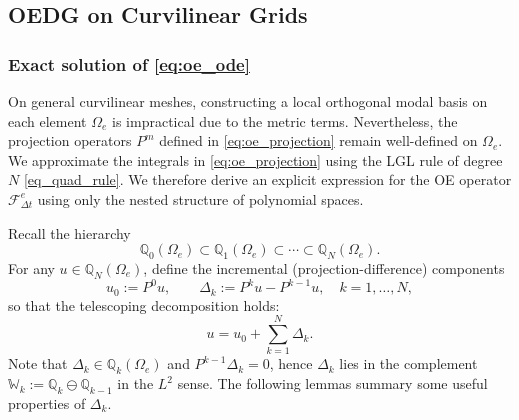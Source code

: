 \documentclass[fleqn,11pt]{amsart}
\newtheorem{remark}{Remark}[section]
\begin{document}

\subsection{OEDG on Curvilinear Grids}
\subsubsection{Exact solution of \eqref{eq:oe_ode}}

On general curvilinear meshes, constructing a local orthogonal modal
basis on each element $\Omega_e$ is impractical due to the metric terms. Nevertheless, the
projection operators $P^m$ defined in \eqref{eq:oe_projection} remain
well-defined on $\Omega_e$. We approximate the integrals in \eqref{eq:oe_projection}
using the LGL rule of degree $N$ \eqref{eq_quad_rule}.
We therefore derive an explicit expression
for the OE operator $\mathcal F_{\Delta t}^e$ using only the nested
structure of polynomial spaces.

Recall the hierarchy
\[
\mathbb Q_0(\Omega_e)\subset \mathbb Q_1(\Omega_e)\subset \cdots \subset \mathbb Q_N(\Omega_e).
\]
For any $u\in \mathbb Q_N(\Omega_e)$, define the incremental
(projection-difference) components
\begin{equation}
\label{eq:oe_curve_decomp}
u_0 := P^0 u, 
\qquad
\Delta_k := P^k u - P^{k-1}u,\quad k=1,\dots,N,
\end{equation}
so that the telescoping decomposition holds:
\begin{equation}
\label{eq:oe_curve_telescoping}
u = u_0 + \sum_{k=1}^N \Delta_k.
\end{equation}
Note that $\Delta_k \in \mathbb Q_k(\Omega_e)$ and
$P^{k-1}\Delta_k = 0$, hence $\Delta_k$ lies in the complement
$\mathbb W_k := \mathbb Q_k \ominus \mathbb Q_{k-1}$ in the $L^2$
sense. The following  lemmas summary some useful properties of $\Delta_k$.
\end{document}
